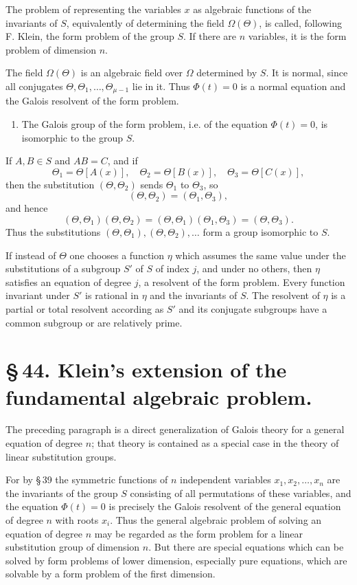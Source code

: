 \documentclass[11pt]{article}
\begin{document}
The problem of representing the variables $x$ as algebraic functions of the invariants of $S$, equivalently of determining the field $\Omega(\Theta)$, is called, following F. Klein, the form problem of the group $S$. If there are $n$ variables, it is the form problem of dimension $n$.

The field $\Omega(\Theta)$ is an algebraic field over $\Omega$ determined by $S$. It is normal, since all conjugates $\Theta,\Theta_1,\ldots,\Theta_{\mu-1}$ lie in it. Thus $\Phi(t)=0$ is a normal equation and the Galois resolvent of the form problem.

\begin{enumerate}[label=\arabic*.,leftmargin=2.2em,start=5]
\item The Galois group of the form problem, i.e. of the equation $\Phi(t)=0$, is isomorphic to the group $S$.
\end{enumerate}
If $A,B\in S$ and $AB=C$, and if
\[
\Theta_1=\Theta[A(x)],
\quad \Theta_2=\Theta[B(x)],
\quad \Theta_3=\Theta[C(x)],
\]
then the substitution $(\Theta,\Theta_2)$ sends $\Theta_1$ to $\Theta_3$, so
\[
(\Theta,\Theta_2)=(\Theta_1,\Theta_3),
\]
and hence
\[
(\Theta,\Theta_1)(\Theta,\Theta_2)=(\Theta,\Theta_1)(\Theta_1,\Theta_3)=(\Theta,\Theta_3).
\]
Thus the substitutions $(\Theta,\Theta_1),(\Theta,\Theta_2),\ldots$ form a group isomorphic to $S$.

If instead of $\Theta$ one chooses a function $\eta$ which assumes the same value under the substitutions of a subgroup $S'$ of $S$ of index $j$, and under no others, then $\eta$ satisfies an equation of degree $j$, a resolvent of the form problem. Every function invariant under $S'$ is rational in $\eta$ and the invariants of $S$. The resolvent of $\eta$ is a partial or total resolvent according as $S'$ and its conjugate subgroups have a common subgroup or are relatively prime.

\section*{\S\,44. Klein's extension of the fundamental algebraic problem.}

The preceding paragraph is a direct generalization of Galois theory for a general equation of degree $n$; that theory is contained as a special case in the theory of linear substitution groups.

For by \S\,39 the symmetric functions of $n$ independent variables $x_1,x_2,\ldots,x_n$ are the invariants of the group $S$ consisting of all permutations of these variables, and the equation $\Phi(t)=0$ is precisely the Galois resolvent of the general equation of degree $n$ with roots $x_i$. Thus the general algebraic problem of solving an equation of degree $n$ may be regarded as the form problem for a linear substitution group of dimension $n$. But there are special equations which can be solved by form problems of lower dimension, especially pure equations, which are solvable by a form problem of the first dimension.
\end{document}
